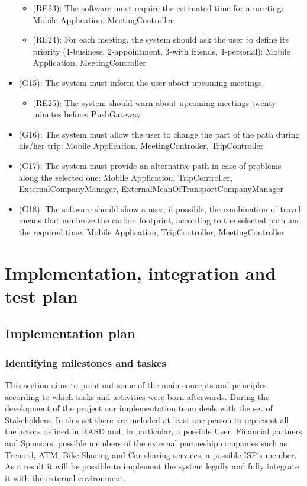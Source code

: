 \documentclass[a4paper,leqno]{article}
\begin{document}
\begin{itemize}
	\begin{itemize}
		\item (RE23):  The software must require the estimated time for a meeting: Mobile Application, MeetingController
		\item (RE24): For each meeting, the system should ask the user to define its priority (1-business, 2-appointment, 3-with friends, 4-personal): Mobile Application, MeetingController
	\end{itemize}
	\item (G15): The system must inform the user about upcoming meetings.
	\begin{itemize}
		\item (RE25): The system should warn about upcoming meetings twenty minutes before: PushGateway
	\end{itemize}
	\item (G16): The system must allow the user to change the part of the path during his/her trip: Mobile Application, MeetingController, TripController
	\item (G17): The system must provide an alternative path in case of problems along the selected one: Mobile Application, TripController, ExternalCompanyManager, ExternalMeanOfTransportCompanyManager
	\item (G18): The software should show a user, if possible, the combination of travel means that minimize the carbon footprint, according to the selected path and the required time: Mobile Application, TripController, MeetingController
	
\end{itemize} 

\newpage
\section{Implementation, integration and test plan}

\subsection{Implementation plan}

\subsubsection{Identifying milestones and taskes}
This section aims to point out some of the main concepts and principles according to which tasks and activities were born afterwards. During the development of the project our implementation team deals with the set of Stakeholders. In this set there are included at least one person to represent all the actors defined in RASD and, in particular, a possible User, Financial partners and Sponsors, possible members of the external partneship companies such as Trenord, ATM, Bike-Sharing and Car-sharing services, a possible ISP's member. As a result it will be possible to implement the system legally and fully integrate it with the external environment.
\end{document}
